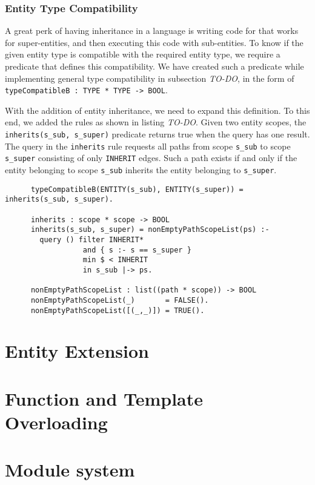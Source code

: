    \subsubsection{Entity Type Compatibility}
      A great perk of having inheritance in a language is writing code for that works for super-entities, and then executing this code with sub-entities. To know if the given entity type is compatible with the required entity type, we require a predicate that defines this compatibility. We have created such a predicate while implementing general type compatibility in subsection \emph{TO-DO}, in the form of \lstinline|typeCompatibleB : TYPE * TYPE -> BOOL|.

      With the addition of entity inheritance, we need to expand this definition. To this end, we added the rules as shown in listing \emph{TO-DO}. Given two entity scopes, the \lstinline|inherits(s_sub, s_super)| predicate returns true when the query has one result. The query in the \texttt{inherits} rule requests all paths from scope \texttt{s\_sub} to scope \texttt{s\_super} consisting of only \texttt{INHERIT} edges. Such a path exists if and only if the entity belonging to scope \texttt{s\_sub} inherits the entity belonging to \texttt{s\_super}.

      \begin{lstlisting}
      typeCompatibleB(ENTITY(s_sub), ENTITY(s_super)) = inherits(s_sub, s_super).

      inherits : scope * scope -> BOOL
      inherits(s_sub, s_super) = nonEmptyPathScopeList(ps) :-
        query () filter INHERIT*
                  and { s :- s == s_super }
                  min $ < INHERIT
                  in s_sub |-> ps.

      nonEmptyPathScopeList : list((path * scope)) -> BOOL
      nonEmptyPathScopeList(_)       = FALSE().
      nonEmptyPathScopeList([(_,_)]) = TRUE().
      \end{lstlisting}

  \section{Entity Extension}

  \section{Function and Template Overloading}

  \section{Module system}

